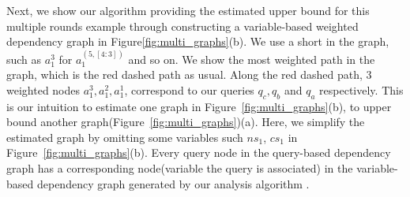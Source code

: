 Next, we show our algorithm providing the estimated upper bound for this multiple rounds example through constructing a variable-based weighted dependency graph in Figure\ref{fig:multi_graphs}(b). We use a short in the graph, such as $a_1^{3}$ for $a_1^{(5, [4:3])}$ and so on. We show the most weighted path in the graph, which is the red dashed path as usual. Along the red dashed path, $3$ weighted nodes $a_1^{3},a_1^{2},a_1^{1} $, correspond to our queries $q_c, q_b$ and $q_a$ respectively. This is our intuition to estimate one graph in Figure~\ref{fig:multi_graphs}(b), to upper bound another graph(Figure~\ref{fig:multi_graphs})(a). Here, we simplify the estimated graph by omitting some variables such $ns_1$, $cs_1$ in  Figure~\ref{fig:multi_graphs}(b).  Every query node in the query-based dependency graph has a corresponding node(variable the query is associated) in the variable-based dependency graph generated by our analysis algorithm {\ADAPTSYSTEM}. 
%
%
%
